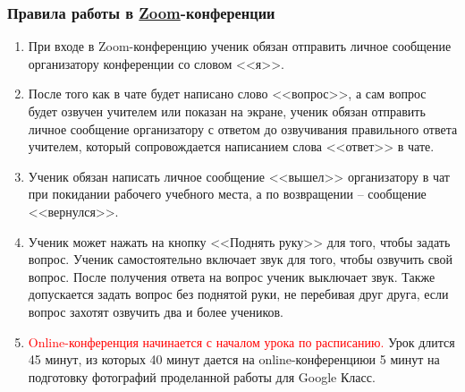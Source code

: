\documentclass[algebra,a5paper]{pum}
\date{11.04.20}
\begin{document}


\subsubsection*{Правила работы в \href{https://zoom.us}{Zoom}-конференции}
\begin{enumerate}[nosep]
  \item При входе в Zoom-конференцию ученик обязан отправить личное сообщение организатору конференции со словом <<я>>.
  \item После того как в чате будет написано слово <<вопрос>>, а сам вопрос будет озвучен учителем или показан на экране, ученик обязан отправить личное сообщение организатору с ответом до озвучивания правильного ответа учителем, который сопровождается написанием слова <<ответ>> в чате.
  \item Ученик обязан написать личное сообщение <<вышел>> организатору в чат при покидании рабочего учебного места, а по возвращении -- сообщение <<вернулся>>.
  \item Ученик может нажать на кнопку <<Поднять руку>> для того, чтобы задать вопрос. Ученик самостоятельно включает звук для того, чтобы озвучить свой вопрос. После получения ответа на вопрос ученик выключает звук. Также допускается задать вопрос без поднятой руки, не перебивая друг друга, если вопрос захотят озвучить два и более учеников.
  \item \textcolor{red}{Online-конференция начинается с началом урока по расписанию.} Урок длится 45 минут, из которых 40 минут дается на online-конференциюи 5 минут на подготовку фотографий проделанной работы для Google Класс. 
\end{enumerate}

\vspace{-0.3cm}
\end{document}
